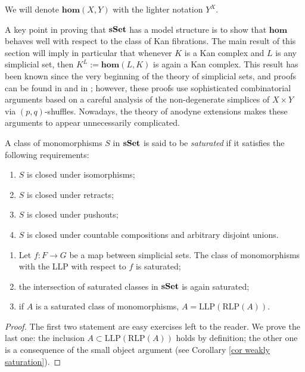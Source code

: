 \begin{refsection}
\begin{notation}
We will denote $\mathbf{hom}(X,Y)$ with the lighter notation $Y^X$.
\end{notation}

A key point in proving that $\mathbf{s\,\!\mathbf{Set}}$ has a model structure is to show that $\mathbf{hom}$ behaves well with respect to the class of Kan fibrations. The main result of this section will imply in particular that whenever $K$ is a Kan complex and $L$ is any simplicial set, then $K^L := \mathbf{hom}(L,K)$ is again a Kan complex. This result has been known since the very beginning of the theory of simplicial sets, and proofs can be found in \cite{gz} and in \cite{may}; however, these proofs use sophisticated combinatorial arguments based on a careful analysis of the non-degenerate simplices of $X \times Y$ via $(p,q)$-shuffles. Nowadays, the theory of anodyne extensions makes these arguments to appear unnecessarily complicated.

\begin{defin}
A class of monomorphisms $S$ in $\mathbf{s\,\!\mathbf{Set}}$ is said to be \emph{saturated} if it satisfies the following requirements:
\begin{enumerate}
\item $S$ is closed under isomorphisms;
\item $S$ is closed under retracts;
\item $S$ is closed under pushouts;
\item $S$ is closed under countable compositions and arbitrary disjoint unions.
\end{enumerate}
\end{defin}

\begin{lemma} \label{lemma llp saturation}
\begin{enumerate}
\item Let $f \colon F \to G$ be a map between simplicial sets. The class of monomorphisms with the LLP with respect to $f$ is saturated;

\item the intersection of saturated classes in $\mathbf{s\,\!\mathbf{Set}}$ is again saturated;

\item if $A$ is a saturated class of monomorphisms, $A = \mathrm{LLP}(\mathrm{RLP}(A))$.
\end{enumerate}
\end{lemma}

\begin{proof}
The first two statement are easy exercises left to the reader. We prove the last one: the inclusion $A \subset \mathrm{LLP}(\mathrm{RLP}(A))$ holds by definition; the other one is a consequence of the small object argument (see Corollary \ref{cor weakly saturation}).
\end{proof}


\end{refsection}
